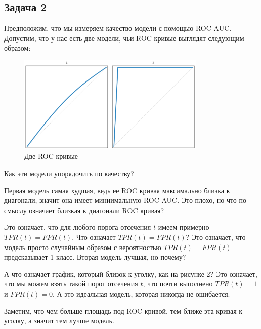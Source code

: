 \subsection*{Задача 2}
Предположим, что мы измеряем качество модели с помощью ROC-AUC. Допустим, что у нас есть две модели, чьи ROC кривые выглядят следующим образом:
\begin{figure}[h]
    \centering
    \includegraphics[width=0.8\textwidth]{roc_curves_comparison_1.png}
    \caption{Две ROC кривые}
\end{figure}
Как эти модели упорядочить по качеству?

\begin{solution}
Первая модель самая худшая, ведь ее ROC кривая максимально близка к диагонали, значит она имеет миниимальную ROC-AUC.
Это плохо, но что по смыслу означает близкая к диагонали ROC кривая?

Это означает, что для любого порога отсечения $t$ имеем примерно $TPR(t) = FPR(t)$.
Что означает $TPR(t) = FPR(t)$? Это означает, что модель просто случайным образом с вероятностью $TPR(t)=FPR(t)$ предсказывает 1 класс.
Вторая модель лучшая, но почему?

А что означает график, который близок к уголку, как на рисунке 2?
Это означает, что мы можем взять такой порог отсечения $t$, что почти выполнено $TPR(t) = 1$ и $FPR(t) = 0$.
А это идеальная модель, которая никогда не ошибается.

Заметим, что чем больше площадь под ROC кривой, тем ближе эта кривая к уголку, а значит тем лучше модель.
\end{solution}
